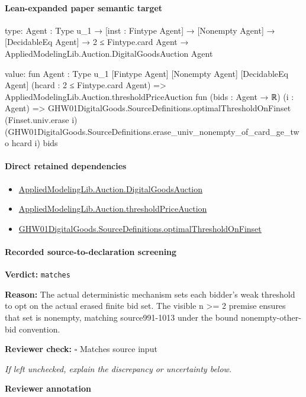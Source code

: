 \documentclass[10pt]{article}
\newcommand{\reviewerbox}{%
  \par\noindent\fbox{\parbox{0.96\linewidth}{\rule{0pt}{0.38in}}}\par
}
\newcommand{\reviewmatch}[1]{%
  \par\noindent\textbf{Reviewer check:} $\square$\; #1\par
  \noindent\emph{If left unchecked, explain the discrepancy or uncertainty below.}\par
}
\begin{document}
\paragraph{Lean-expanded paper semantic target}
\begin{ReviewVerbatim}
type:
{Agent : Type u_1} →
  [inst : Fintype Agent] →
    [Nonempty Agent] →
      [DecidableEq Agent] → 2 ≤ Fintype.card Agent → AppliedModelingLib.Auction.DigitalGoodsAuction Agent

value:
fun {Agent : Type u_1} [Fintype Agent] [Nonempty Agent] [DecidableEq Agent] (hcard : 2 ≤ Fintype.card Agent) =>
  AppliedModelingLib.Auction.thresholdPriceAuction fun (bids : Agent → ℝ) (i : Agent) =>
    GHW01DigitalGoods.SourceDefinitions.optimalThresholdOnFinset (Finset.univ.erase i)
      (GHW01DigitalGoods.SourceDefinitions.erase_univ_nonempty_of_card_ge_two hcard i) bids
\end{ReviewVerbatim}

\paragraph{Direct retained dependencies}
\begin{itemize}\raggedright
\item \hyperlink{governing-declaration-7d5372964da104c4}{Applied\allowbreak{}Modeling\allowbreak{}Lib.\allowbreak{}Auction.\allowbreak{}Digital\allowbreak{}Goods\allowbreak{}Auction}
\item \hyperlink{governing-declaration-c4b64ec28b650f4b}{Applied\allowbreak{}Modeling\allowbreak{}Lib.\allowbreak{}Auction.\allowbreak{}threshold\allowbreak{}Price\allowbreak{}Auction}
\item \hyperlink{governing-declaration-912e873776309da6}{GHW01\allowbreak{}Digital\allowbreak{}Goods.\allowbreak{}Source\allowbreak{}Definitions.\allowbreak{}optimal\allowbreak{}Threshold\allowbreak{}On\allowbreak{}Finset}
\end{itemize}
\paragraph{Recorded source-to-declaration screening}
\textbf{Verdict:} \texttt{matches}
\\
{\raggedright
\textbf{Reason:} The actual deterministic mechanism sets each bidder's weak threshold to opt on the actual erased finite bid set.\allowbreak{} The visible n >= 2 premise ensures that set is nonempty, matching source991-\allowbreak{}1013 under the bound nonempty-\allowbreak{}other-\allowbreak{}bid convention.\allowbreak{}
\par}
\reviewmatch{Matches source input}
\noindent\textbf{Reviewer annotation}\par
\reviewerbox
\clearpage
\hypertarget{paper-prerequisite-e3ae90f67eac7771}{}
\end{document}
